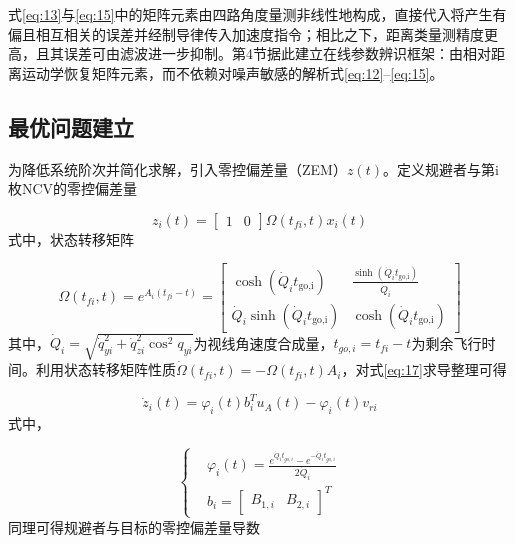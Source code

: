 \begin{assumption}[量测条件]
式\eqref{eq:13}与\eqref{eq:15}中的矩阵元素由四路角度量测非线性地构成，直接代入将产生有偏且相互相关的误差并经制导律传入加速度指令；相比之下，距离类量测精度更高，且其误差可由滤波进一步抑制。第4节据此建立在线参数辨识框架：由相对距离运动学恢复矩阵元素，而不依赖对噪声敏感的解析式\eqref{eq:12}--\eqref{eq:15}。
\end{assumption}

\subsection{最优问题建立}
为降低系统阶次并简化求解，引入零控偏差量（ZEM）$z(t)$。定义规避者与第i枚NCV的零控偏差量

\begin{equation}
\label{eq:17}
{z_i}(t) = \left[ {\begin{array}{*{20}{c}}
  1&0 
\end{array}} \right]\Omega \left( {{t_{fi}},t} \right){x_i}(t)
\end{equation}
式中，状态转移矩阵

\begin{equation}
\label{eq:18}
\Omega \left( {{t_{fi}},t} \right) = {e^{{A_i}\left( {{t_{fi}} - t} \right)}} = \left[ {\begin{array}{*{20}{c}}
  {\cosh ({{\dot Q}_i}{t_{{\text{go,i}}}})}&{\frac{{\sinh ({{\dot Q}_i}{t_{{\text{go,i}}}})}}{{{{\dot Q}_i}}}} \\ 
  {{{\dot Q}_i}\sinh ({{\dot Q}_i}{t_{{\text{go,i}}}})}&{\cosh ({{\dot Q}_i}{t_{{\text{go,i}}}})} 
\end{array}} \right]
\end{equation}
其中，${\dot Q_i} = \sqrt {\dot q_{yi}^2 + \dot q_{zi}^2{{\cos }^2}{q_{yi}}} $为视线角速度合成量，${t_{go,i}} = {t_{fi}} - t$为剩余飞行时间。利用状态转移矩阵性质$\dot \Omega \left( {{t_{fi}},t} \right) =  - \Omega \left( {{t_{fi}},t} \right){A_i}$，对式\eqref{eq:17}求导整理可得

\begin{equation}
\label{eq:19}
{\dot z_i}(t) = {\varphi _i}(t)b_i^T{u_A}(t) - {\varphi _i}(t){v_{ri}}
\end{equation}
式中，

\begin{equation}
\label{eq:20}
\left\{
\begin{aligned}
& {\varphi _i}(t) = \frac{{{e^{{{\dot Q}_i}{t_{go,i}}}} - {e^{ - {{\dot Q}_i}{t_{go,i}}}}}}{{2{{\dot Q}_i}}} \\
& {b_i} = {\left[ {\begin{array}{*{20}{c}}
  {{B_{1,i}}}&{{B_{2,i}}}
\end{array}} \right]^T}
\end{aligned}
\right.
\end{equation}
同理可得规避者与目标的零控偏差量导数

